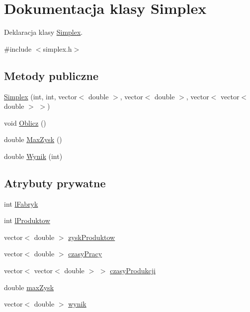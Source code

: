 \hypertarget{class_simplex}{\section{\-Dokumentacja klasy \-Simplex}
\label{class_simplex}
}


\-Deklaracja klasy \hyperlink{class_simplex}{\-Simplex}.  




{\ttfamily \#include $<$simplex.\-h$>$}

\subsection*{\-Metody publiczne}
\begin{DoxyCompactItemize}
\item 
\hyperlink{class_simplex_af6f55e322195fb36e8ab68262ec67165}{\-Simplex} (int, int, vector$<$ double $>$, vector$<$ double $>$, vector$<$ vector$<$ double $>$ $>$)
\item 
void \hyperlink{class_simplex_a35bc6fb855df79d43f50c83adee9a564}{\-Oblicz} ()
\item 
double \hyperlink{class_simplex_a62d569cafc5aeb61fa8177cc7301e46f}{\-Max\-Zysk} ()
\item 
double \hyperlink{class_simplex_a6989aacd7767392a9871157a8bd8c67d}{\-Wynik} (int)
\end{DoxyCompactItemize}
\subsection*{\-Atrybuty prywatne}
\begin{DoxyCompactItemize}
\item 
int \hyperlink{class_simplex_a0f6d3ab52d2961e257233c81d4c64c81}{l\-Fabryk}
\item 
int \hyperlink{class_simplex_af05273be3561d707b029894f551bf1fc}{l\-Produktow}
\item 
vector$<$ double $>$ \hyperlink{class_simplex_a3069699ee42dbdb3d94653cefcefd9cc}{zysk\-Produktow}
\item 
vector$<$ double $>$ \hyperlink{class_simplex_a274a651cf1805d25483f1c190d41c0b3}{czasy\-Pracy}
\item 
vector$<$ vector$<$ double $>$ $>$ \hyperlink{class_simplex_a05c1f84eee26b312e4f918016c435a48}{czasy\-Produkcji}
\item 
double \hyperlink{class_simplex_a542e1d670562fb3fa9f11546071c6738}{max\-Zysk}
\item 
vector$<$ double $>$ \hyperlink{class_simplex_a18ae1c3fa2099205b28eb7200c061e9c}{wynik}
\end{DoxyCompactItemize}


